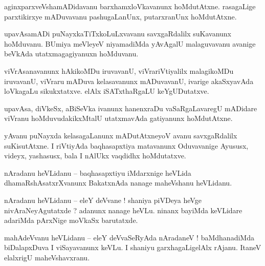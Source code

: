 \documentclass{article}
\begin{document}
\begin{mn}%
aginxparxveVshamADidavanu barxhamxloVkavanunx hoMdutAtxne. rasagaLige parxtikirxye mADuvavanu 
pashugaLanUnx, putarxranUnx hoMdutAtxne.
\end{mn}

\begin{mn}%
upavAsamADi puNayxkaTiTxkoLuLxvavanu savxgaRdalilx suKavanunx hoMduvanu. BUmiya meVleyeV 
niyamadiMda yAvAgalU malaguvavanu avanige beVkAda utatxmagagiyanuxn hoMduvanu.
\end{mn}

\begin{mn}%
viVrAsanavanunx hAkikoMDu iruvavanU, viVrariVtiyalilx malagikoMDu iruvavanU, viVraru mADuva 
kelasavanunx mADuvavanU, ivarige akaSxyavAda loVkagaLu sikukxtatxve. elAlx iSATxthaRgaLU 
keYgUDutatxve.
\end{mn}

\begin{mn}%
upavAsa, diVkeSx, aBiSeVka ivanunx hanenxraDu vaSaRgaLavaregU mADidare viVranu hoMduvudakikxMtalU 
utatxmavAda gatiyanunx hoMdutAtxne.
\end{mn}

\begin{mn}%
yAvanu puNayxda kelasagaLanunx mADutAtxneyoV avanu savxgaRdalilx suKisutAtxne. I riVtiyAda 
baqhasapxtiya matavanunx Oduvavanige Ayususx, videyx, yashasusx, bala I nAlUkx vaqdidhx hoMdutatxve.
\end{mn}

\begin{mn}%
nAradanu heVLidanu -- baqhasapxtiyu iMdarxnige heVLida dhamaRshAsatxrXvanunx BakatxnAda nanage 
maheVshanu heVLidanu.
\end{mn}


\begin{mn}%
nAradanu heVLidanu -- eleY deVvane ! shaniya piVDeya heVge nivAraNeyAgutatxde ? adanunx nanage 
heVLu. ninanx bayiMda keVLidare adariMda pArxNige moVkaSx barutatxde.
\end{mn}

\begin{mn}%
mahAdeVvanu heVLidanu -- eleY deVvaSeRyAda nAradaneV ! baMdhanadiMda biDalapxDuva I viSayavanunx 
keVLu. I shaniyu garxhagaLigelAlx rAjanu. ItaneV elalxrigU maheVshavxranu.
\end{mn}
\end{document}
